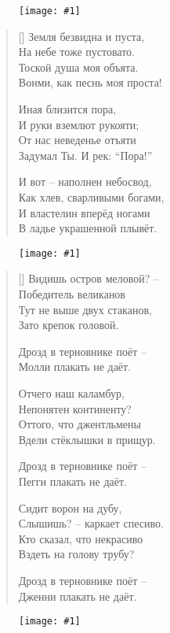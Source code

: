 \documentclass[12pt,a5paper,twoside]{article}
\newcommand{\pict}[1]{\thispagestyle{empty}\begin{figure}[H]\begin{center}\texttt{[image: \#1]}\end{center}\end{figure}\newpage}
\begin{document}
\pict{picts/zemla_bezvidna_i_pusta} 


\settowidth{\versewidth}{Земля безвидна и пуста,}
\begin{verse}[\versewidth]
Земля безвидна и пуста,\\
На небе тоже пустовато.\\
Тоской душа моя объята.\\
Вонми, как песнь моя проста!

Иная близится пора,\\
И руки вземлют рукояти;\\
От нас неведенье отъяти\\
Задумал Ты. И рек: “Пора!”

И вот – наполнен небосвод,\\
Как хлев, сварливыми богами,\\
И властелин вперёд ногами\\
В ладье украшенной плывёт.
\end{verse}
\newpage

\pict{picts/Pesenka_ob_anglii} 

	
\settowidth{\versewidth}{Видишь остров меловой? –}
\begin{verse}[\versewidth]
Видишь остров меловой? –\\
Победитель великанов\\
Тут не выше двух стаканов,\\
Зато крепок головой.

Дрозд в терновнике поёт –\\
Молли плакать не даёт.

Отчего наш каламбур,\\
Непонятен континенту?\\
Оттого, что джентльмены\\
Вдели стёклышки в прищур.

Дрозд в терновнике поёт –\\
Пегги плакать не даёт.

Сидит ворон на дубу,\\
Слышишь? – каркает спесиво.\\
Кто сказал, что некрасиво\\
Вздеть на голову трубу?

Дрозд в терновнике поёт –\\
Дженни плакать не даёт.
\end{verse}
\newpage

\pict{picts/vozmi_svoy_gezl} 
\end{document}
